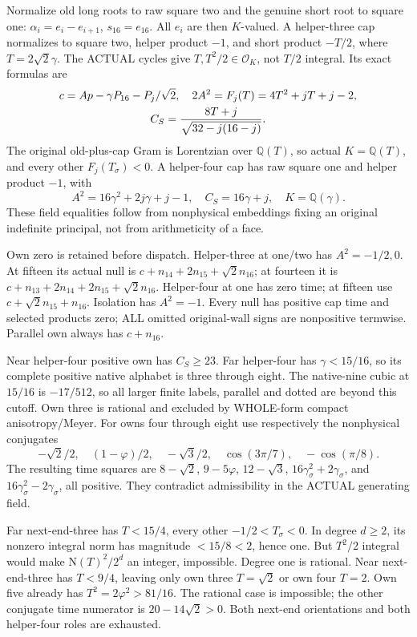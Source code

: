 Normalize old long roots to raw square two and
the genuine short root to square one:
\(\alpha_i=e_i-e_{i+1}\), \(s_{16}=e_{16}\).
All \(e_i\) are then \(K\)-valued.
A helper-three cap normalizes to square two,
helper product \(-1\), and short product \(-T/2\),
where \(T=2\sqrt2\gamma\).
The ACTUAL cycles give
\(T,T^2/2\in\mathcal O_K\), not \(T/2\) integral.
Its exact formulas are
\[
 \begin{gathered}
 c=Ap-\gamma P_{16}-P_j/\sqrt2,\quad
 2A^2=F_j(T)=4T^2+jT+j-2,\\
 C_S={8T+j\over\sqrt{32-j(16-j)}} .
 \end{gathered}
\]
The original old-plus-cap Gram is Lorentzian over
\(\mathbb Q(T)\), so actual \(K=\mathbb Q(T)\),
and every other \(F_j(T_\sigma)<0\).
A helper-four cap has raw square one and helper
product \(-1\), with
\[
       A^2=16\gamma^2+2j\gamma+j-1,\quad
       C_S=16\gamma+j,\quad K=\mathbb Q(\gamma).
\]
These field equalities follow from nonphysical
embeddings fixing an original indefinite principal,
not from arithmeticity of a face.

Own zero is retained before dispatch.
Helper-three at one/two has \(A^2=-1/2,0\).
At fifteen its actual null is
\(c+n_{14}+2n_{15}+\sqrt2n_{16}\);
at fourteen it is
\(c+n_{13}+2n_{14}+2n_{15}+\sqrt2n_{16}\).
Helper-four at one has zero time;
at fifteen use \(c+\sqrt2n_{15}+n_{16}\).
Isolation has \(A^2=-1\).
Every null has positive cap time and selected
products zero; ALL omitted original-wall signs
are nonpositive termwise.
Parallel own always has \(c+n_{16}\).

Near helper-four positive own has \(C_S\ge23\).
Far helper-four has \(\gamma<15/16\), so its
complete positive native alphabet is
three through eight.
The native-nine cubic at \(15/16\) is
\(-17/512\), so all larger finite labels, parallel
and dotted are beyond this cutoff.
Own three is rational and excluded by WHOLE-form
compact anisotropy/Meyer.
For owns four through eight use respectively
the nonphysical conjugates
\[
 -\sqrt2/2,\quad(1-\varphi)/2,\quad-\sqrt3/2,\quad
 \cos(3\pi/7),\quad-\cos(\pi/8).
\]
The resulting time squares are
\(8-\sqrt2\), \(9-5\varphi\), \(12-\sqrt3\),
\(16\gamma_\sigma^2+2\gamma_\sigma\), and
\(16\gamma_\sigma^2-2\gamma_\sigma\), all positive.
They contradict admissibility in the ACTUAL
generating field.

Far next-end-three has
\(T<15/4\), every other \(-1/2<T_\sigma<0\).
In degree \(d\ge2\), its nonzero integral norm
has magnitude \(<15/8<2\), hence one.
But \(T^2/2\) integral would make
\(\mathrm N(T)^2/2^d\) an integer, impossible.
Degree one is rational.
Near next-end-three has \(T<9/4\), leaving only
own three \(T=\sqrt2\) or own four \(T=2\).
Own five already has \(T^2=2\varphi^2>81/16\).
The rational case is impossible; the other
conjugate time numerator is \(20-14\sqrt2>0\).
Both next-end orientations and both helper-four
roles are exhausted.

